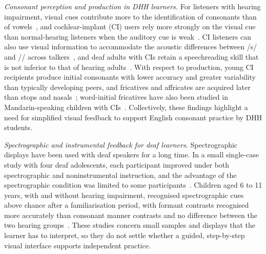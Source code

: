 \documentclass[conference]{IEEEtran}
\newcommand{\ipa}[1]{/#1/}
\begin{document}
\textit{Consonant perception and production in DHH learners.} For listeners with hearing impairment, visual cues contribute more to the identification of consonants than of vowels~\cite{moradi2017}, and cochlear-implant (CI) users rely more strongly on the visual cue than normal-hearing listeners when the auditory cue is weak~\cite{desai2008}. CI listeners can also use visual information to accommodate the acoustic differences between \ipa{s} and \ipa{\textesh} across talkers~\cite{winn2013}, and deaf adults with CIs retain a speechreading skill that is not inferior to that of hearing adults~\cite{pimperton2017}. With respect to production, young CI recipients produce initial consonants with lower accuracy and greater variability than typically developing peers, and fricatives and affricates are acquired later than stops and nasals~\cite{ertmer2011}; word-initial fricatives have also been studied in Mandarin-speaking children with CIs~\cite{yang2017}. Collectively, these findings highlight a need for simplified visual feedback to support English consonant practice by DHH students.

\textit{Spectrographic and instrumental feedback for deaf learners.} Spectrographic displays have been used with deaf speakers for a long time. In a small single-case study with four deaf adolescents, each participant improved under both spectrographic and noninstrumental instruction, and the advantage of the spectrographic condition was limited to some participants~\cite{ertmermaki2000}. Children aged 6 to 11 years, with and without hearing impairment, recognised spectrographic cues above chance after a familiarisation period, with formant contrasts recognised more accurately than consonant manner contrasts and no difference between the two hearing groups~\cite{ertmer2004}. These studies concern small samples and displays that the learner has to interpret, so they do not settle whether a guided, step-by-step visual interface supports independent practice.
\end{document}
